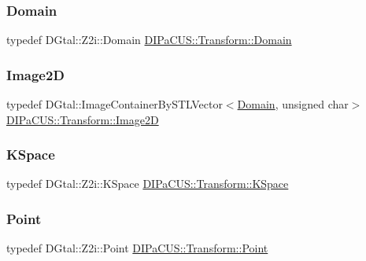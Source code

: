 \subsubsection{\texorpdfstring{Domain}{Domain}}
{\footnotesize\ttfamily typedef D\+Gtal\+::\+Z2i\+::\+Domain \hyperlink{namespaceDIPaCUS_1_1Transform_a6da009851d50adae6e3e93ce4550cbda}{D\+I\+Pa\+C\+U\+S\+::\+Transform\+::\+Domain}}

\mbox{\label{namespaceDIPaCUS_1_1Transform_a73f8942865bc5b3a01401bf07efd3734}} 
\subsubsection{\texorpdfstring{Image2D}{Image2D}}
{\footnotesize\ttfamily typedef D\+Gtal\+::\+Image\+Container\+By\+S\+T\+L\+Vector$<$\hyperlink{namespaceDIPaCUS_1_1Transform_a6da009851d50adae6e3e93ce4550cbda}{Domain}, unsigned char$>$ \hyperlink{namespaceDIPaCUS_1_1Transform_a73f8942865bc5b3a01401bf07efd3734}{D\+I\+Pa\+C\+U\+S\+::\+Transform\+::\+Image2D}}

\mbox{\label{namespaceDIPaCUS_1_1Transform_a29a1b6c9e9e766045633377156b5a81c}} 
\subsubsection{\texorpdfstring{K\+Space}{KSpace}}
{\footnotesize\ttfamily typedef D\+Gtal\+::\+Z2i\+::\+K\+Space \hyperlink{namespaceDIPaCUS_1_1Transform_a29a1b6c9e9e766045633377156b5a81c}{D\+I\+Pa\+C\+U\+S\+::\+Transform\+::\+K\+Space}}

\mbox{\label{namespaceDIPaCUS_1_1Transform_a3d5053cb006656a776156934f3c365ec}} 
\subsubsection{\texorpdfstring{Point}{Point}}
{\footnotesize\ttfamily typedef D\+Gtal\+::\+Z2i\+::\+Point \hyperlink{namespaceDIPaCUS_1_1Transform_a3d5053cb006656a776156934f3c365ec}{D\+I\+Pa\+C\+U\+S\+::\+Transform\+::\+Point}}



